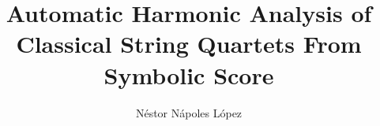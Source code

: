 \documentclass[a4paper,12pt,twoside]{report}
\begin{document}

\title{Automatic Harmonic Analysis of Classical String Quartets From Symbolic Score}
\author{N\'estor N\'apoles L\'opez}

\maketitle

\maketitle
\restoregeometry

\preface
\cleardoublepage




\body

\normallinespacing











\listoffigures
\newpage
\listoftables





\end{document}
